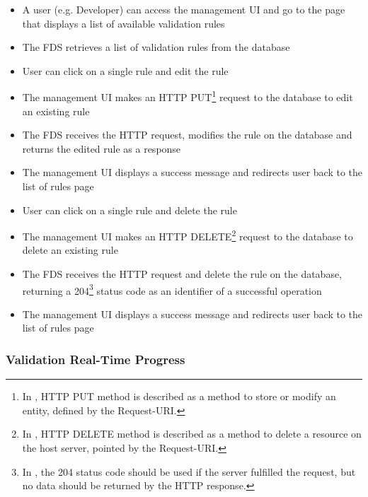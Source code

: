 \begin{itemize}
 \item A user (e.g. Developer) can access the management UI and go to the page that displays a list of available validation rules
 \item The FDS retrieves a list of validation rules from the database
 \item User can click on a single rule and edit the rule
 \item The management UI makes an HTTP PUT\footnote{In \autocite[\enquote{9.6 PUT}]{http-rfc}, HTTP PUT method is described as a method to store or modify an entity, defined by the Request-URI.} request to the database to edit an existing rule
 \item The FDS receives the HTTP request, modifies the rule on the database and returns the edited rule as a response
 \item The management UI displays a success message and redirects user back to the list of rules page
 \item User can click on a single rule and delete the rule
 \item The management UI makes an HTTP DELETE\footnote{In \autocite[\enquote{9.7 DELETE}]{http-rfc}, HTTP DELETE method is described as a method to delete a resource on the host server, pointed by the Request-URI.} request to the database to delete an existing rule
 \item The FDS receives the HTTP request and delete the rule on the database, returning a 204\footnote{In \autocite[\enquote{10.2.5 204 No Content}]{http-rfc}, the 204 status code should be used if the server fulfilled the request, but no data should be returned by the HTTP response.} status code as an identifier of a successful operation
 \item The management UI displays a success message and redirects user back to the list of rules page
\end{itemize} 


\subsubsection{Validation Real-Time Progress}

